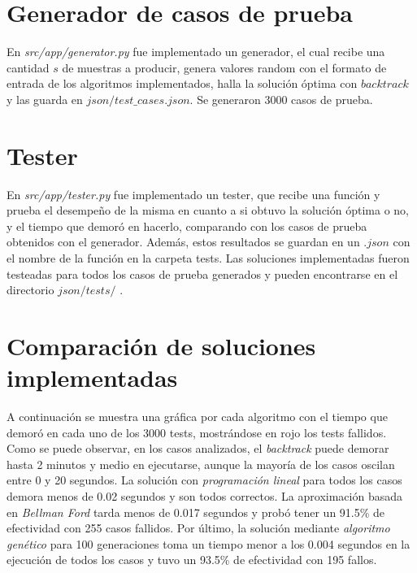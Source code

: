 \documentclass[10pt]{article} %
\begin{document}
	\section{Generador de casos de prueba}
	
	En \textit{src/app/generator.py} fue implementado un generador, el cual recibe una cantidad $ s $ de muestras a producir, genera valores random con el formato de entrada de los algoritmos implementados, halla la soluci\'on \'optima con $ backtrack $ y las guarda en $ json/test\_cases.json $. Se generaron 3000 casos de prueba.
	
	\section{Tester}
	En \textit{src/app/tester.py} fue implementado un tester, que recibe una funci\'on y prueba el desempe\~no de la misma en cuanto a si obtuvo la soluci\'on \'optima o no, y el tiempo que demor\'o en hacerlo, comparando con los casos de prueba obtenidos con el generador. Adem\'as, estos resultados se guardan en un $ .json $ con el nombre de la funci\'on en la carpeta tests. Las soluciones implementadas fueron testeadas para todos los casos de prueba generados y pueden encontrarse en el directorio $ json/tests/ $ .
	
	\section{Comparaci\'on de soluciones implementadas}          

    A continuaci\'on se muestra una gr\'afica por cada algoritmo con el tiempo que demor\'o en cada uno de los 3000 tests, mostr\'andose en rojo los tests fallidos. Como se puede observar, en los casos analizados, el \textit{backtrack} puede demorar hasta 2 minutos y medio en ejecutarse, aunque la mayor\'ia de los casos oscilan entre 0 y 20 segundos. La soluci\'on con \textit{programaci\'on lineal} para todos los casos demora menos de 0.02 segundos y son todos correctos. La aproximaci\'on basada en \textit{Bellman Ford} tarda menos de 0.017 segundos y prob\'o tener un 91.5\% de efectividad con 255 casos fallidos. Por \'ultimo, la soluci\'on mediante \textit{algoritmo gen\'etico} para 100 generaciones toma un tiempo menor a los 0.004 segundos en la ejecuci\'on de todos los casos y tuvo un 93.5\% de efectividad con 195 fallos. 
   
\end{document}
